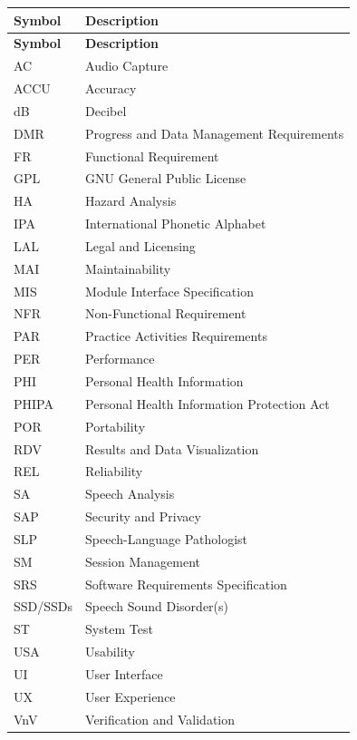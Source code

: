\documentclass[12pt, titlepage]{article}
\begin{document}
\begin{longtable}{l l}
    \toprule
    \textbf{Symbol} & \textbf{Description} \\
    \midrule
    \endfirsthead

    \toprule
    \textbf{Symbol} & \textbf{Description} \\
    \midrule
    \endhead

    \bottomrule
    \endfoot

    AC & Audio Capture \\
    ACCU & Accuracy \\
    dB & Decibel \\
    DMR & Progress and Data Management Requirements \\
    FR & Functional Requirement \\
    GPL & GNU General Public License \\
    HA & Hazard Analysis \\
    IPA & International Phonetic Alphabet \\
    LAL & Legal and Licensing \\
    MAI & Maintainability \\
    MIS & Module Interface Specification \\
    NFR & Non-Functional Requirement \\
    PAR & Practice Activities Requirements \\
    PER & Performance \\
    PHI & Personal Health Information \\
    PHIPA & Personal Health Information Protection Act \\
    POR & Portability \\
    RDV & Results and Data Visualization \\
    REL & Reliability \\
    SA & Speech Analysis \\
    SAP & Security and Privacy \\
    SLP & Speech-Language Pathologist \\
    SM & Session Management \\
    SRS & Software Requirements Specification \\
    SSD/SSDs & Speech Sound Disorder(s) \\
    ST & System Test \\
    USA & Usability \\
    UI & User Interface \\
    UX & User Experience \\
    VnV & Verification and Validation \\
\end{longtable}
\end{document}
